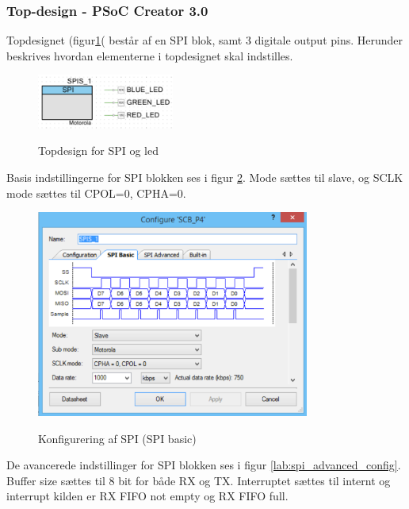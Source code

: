 
\subsubsection*{Top-design - PSoC Creator 3.0}

Topdesignet (figur\ref{lab:topdesign_spi}( består af en SPI blok, samt 3 digitale output pins. Herunder beskrives hvordan elementerne i topdesignet skal indstilles.

\begin{figure}[H] \centering
{\includegraphics[width=0.4\textwidth]{filer/implementering/spi/spi_handler_topdesign}}
\caption{Topdesign for SPI og led}
\label{lab:topdesign_spi}
\raggedright
\end{figure}

Basis indstillingerne for SPI blokken ses i figur \ref{lab:spi_basic_config}. Mode sættes til slave, og SCLK mode sættes til CPOL=0, CPHA=0.

\begin{figure}[H] \centering
{\includegraphics[width=0.8\textwidth]{filer/implementering/spi/spi_handler_topdesign_spi_basic}}
\caption{Konfigurering af SPI (SPI basic)}
\label{lab:spi_basic_config}
\raggedright
\end{figure}

De avancerede indstillinger for SPI blokken ses i figur \ref{lab:spi_advanced_config}. Buffer size sættes til 8 bit for både RX og TX. Interruptet sættes til internt og interrupt kilden er RX FIFO not empty og RX FIFO full.

